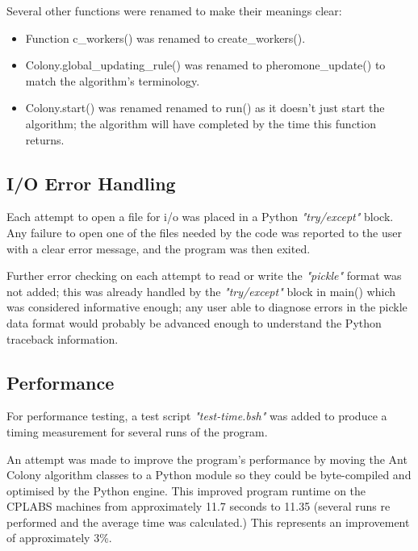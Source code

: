 \documentclass[11pt, oneside]{article}   %
\begin{document}
Several other functions were renamed to make their meanings clear: 
\begin{itemize}
\item Function c\_workers() was renamed to create\_workers().
\item Colony.global\_updating\_rule() was renamed to pheromone\_update() to match the algorithm's terminology.
\item Colony.start() was renamed renamed to run() as it doesn't just start the algorithm; the algorithm will have completed by the time this function returns.
\end{itemize}

\subsection{I/O Error Handling}

Each attempt to open a file for i/o was placed in a Python {\em "try/except"} block.
Any failure to open one of the files needed by the code was reported to the user with a clear error message, and the program was then exited.

Further error checking on each attempt to read or write the {\em "pickle"} format was not added; this was already handled by the {\em "try/except"} block in main() which was considered informative enough; any user able to diagnose errors in the pickle data format would probably be advanced enough to understand the Python traceback information.

\subsection{Performance}

For performance testing, a test script {\em "test-time.bsh"} was added to produce a timing measurement for several runs of the program.

An attempt was made to improve the program’s performance by moving the Ant Colony algorithm classes to a Python module so they could be byte-compiled and optimised by the Python engine.
This improved program runtime on the CPLABS machines from approximately 11.7 seconds to 11.35 (several runs re performed and the average time was calculated.)
This represents an improvement of approximately 3\%.
\end{document}
